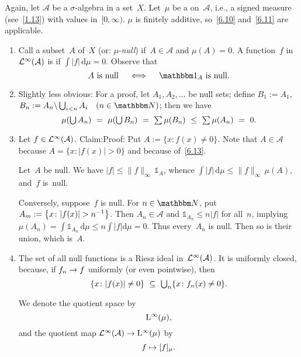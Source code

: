 \documentclass[main.tex]{subfiles}
\begin{document}
\begin{psec}{6.16}%
Again,
let $\mathcal A$ be a $\sigma$-algebra in a set~$X$.
Let~$\mu$ be a  on~$\mathcal A$,
i.e., a signed measure (see~\ref{1.13})
with values in~$[0,\infty)$.
$\mu$ is finitely additive,
so~\ref{6.10} and~\ref{6.11} are applicable.
\begin{enumerate}
\item\label{6.16-1}
Call a subset~$A$ of~$X$  (or: $\mu$-\emph{null})
if~$A\in\mathcal A$ and $\mu(A)=0$.
A function~$f$ in~$\mathcal{L}^\infty(\mathcal A)$ is 
if $\int|f|\,\mathrm{d}\mu =0$.
Observe that 
\begin{equation*}
A\htam{ is null}\quad\iff\quad\mathbb{1}_A\htam{ is null.}
\end{equation*}
%
\item\label{6.16-2}
Slightly less obvious:
For a proof,
let $A_1,A_2,\dotsc$ be null sets;
define $B_1:=A_1$, 
$B_n:=A_n\backslash \bigcup_{i<n} A_i \quad (n\in\N)$; then we have
\begin{equation*}
\textstyle \mu(\bigcup A_n)\ 
=\ \mu(\bigcup B_n)\ 
=\ \sum \mu(B_n)\ 
\leq\ \sum \mu(A_n)\ =\ 0\htam{.}
\end{equation*}
%
\item\label{6.16-3}
Let $f\in\mathcal{L}^\infty(\mathcal A)$.
Claim:\statement{
\begin{equation*}
\textstyle f\htam{ is null} \quad\iff\quad 
   \bigl\{x\colon f(x)\neq 0\bigr\}\htam{ is null.}
\end{equation*}
}Proof:
Put $A:=\{x\colon f(x)\neq 0\}$.
Note that $A\in\mathcal{A}$ because $A=\{x\colon |f(x)|>0\}$
and because of~\ref{6.13}.

Let~$A$ be null.
We have $|f|\leq\|f\|_\infty\,\mathbb{1}_A$,
whence $\int |f|\,\mathrm{d}\mu \leq \|f\|_\infty\,\mu(A)$,
and~$f$ is~null.

Conversely,
suppose~$f$ is null. 
For $n\in\N$, put
 $A_m:=\smash{\bigl\{x\colon |f(x)|>n^{-1}\bigr\}}$.
Then $A_n\in\mathcal A$ and $\mathbb{1}_{A_n}\leq n|f|$ for all~$n$,
implying
$\mu(A_n) 
= \int \mathbb{1}_{A_n}\,\mathrm{d}\mu
\leq n\int|f|\mathrm{d}\mu =0$.
Thus every~$A_n$ is null.
Then so is their union,
which is~$A$.
%
\item\label{6.16-4}
The set of all null functions
is a Riesz ideal in~$\mathcal{L}^\infty(\mathcal A)$.
It is uniformly closed,
because,
if $f_n\rightarrow f$ uniformly (or even pointwise),
then 
\begin{equation*}
\textstyle \{x\colon |f(x)|\neq 0\} 
\ \subseteq\  \bigcup_n \{ x\colon f_n(x)\neq 0\}\text{.}
\end{equation*}

We denote the quotient space by
\begin{equation*}
\mathrm{L}^\infty(\mu)\text{,}
\end{equation*}
and the quotient map $\mathcal{L}^\infty(\mathcal A)\rightarrow\mathrm{L}^\infty(\mu)$ by
\begin{equation*}
f\mapsto [f]_\mu\text{.}
\end{equation*}
\end{enumerate}
\end{psec}
\end{document}
